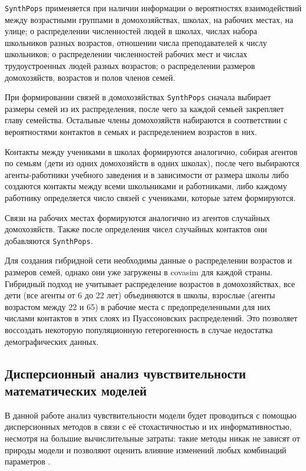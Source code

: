 \documentclass[a4paper,12pt]{article} %
\begin{document}
\texttt{SynthPops} применяется при наличии информации о вероятностях взаимодействий между возрастными группами в домохозяйствах, школах, на рабочих местах, на улице; о распределении численностей людей в школах, числах набора школьников разных возрастов, отношении числа преподавателей к числу школьников; о распределении численностей рабочих мест и числах трудоустроенных людей разных возрастов; о распределении размеров домохозяйств, возрастов и полов членов семей. 

При формировании связей в домохозяйствах \texttt{SynthPops} сначала выбирает размеры семей из их распределения, после чего за каждой семьей закрепляет главу семейства. Остальные члены домохозяйств набираются в соответствии с вероятностями контактов в семьях и распределением возрастов в них.

Контакты между учениками в школах формируются аналогично, собирая агентов по семьям (дети из одних домохозяйств в одних школах), после чего выбираются агенты-работники учебного заведения и в зависимости от размера школы либо создаются контакты между всеми школьниками и работниками, либо каждому работнику определяется число связей с учениками, которые затем формируются.

Связи на рабочих местах формируются аналогично из агентов случайных домохозяйств. Также после определения чисел случайных контактов они добавляются \texttt{SynthPops}.

Для создания гибридной сети необходимы данные о распределении возрастов и размеров семей, однако они уже загружены в \gls{covasim} для каждой страны. Гибридный подход не учитывает распределение возрастов в домохозяйствах, все дети (все агенты от 6 до 22 лет) объединяются в школы, взрослые (агенты возрастом между 22 и 65) в рабочие места с предопределенными для них числами контактов в этих слоях из Пуассоновских распределений. Это позволяет воссоздать некоторую популяционную гетерогенность в случае недостатка демографических данных.



\subsection{Дисперсионный анализ чувствительности математических моделей}

В данной работе анализ чувствительности модели будет проводиться с помощью дисперсионных методов в связи с её стохастичностью и их информативностью, несмотря на большие вычислительные затраты: такие методы никак не зависят от природы модели и позволяют оценить влияние изменений любых комбинаций параметров \cite{saltelli2008global}.
\end{document}
